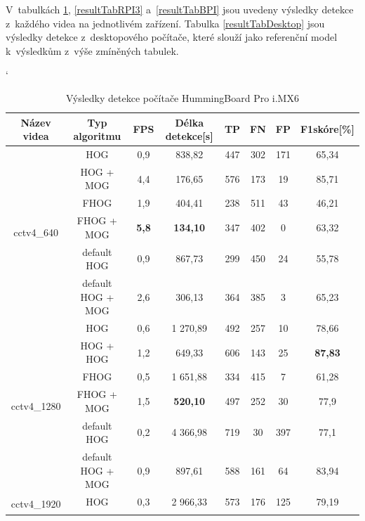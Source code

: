 V~tabulkách \ref{resultTabIMX}, \ref{resultTabRPI3} a~\ref{resultTabBPI} jsou uvedeny výsledky detekce z~každého videa na jednotlivém zařízení. Tabulka \ref{resultTabDesktop} jsou výsledky detekce z~desktopového počítače, které slouží jako referenční model k~výsledkům z~výše zmíněných tabulek.  
\begin{table}[H]
\catcode`
\centering
\caption{Výsledky detekce počítače HummingBoard Pro i.MX6 }
\label{resultTabIMX}
\begin{tabular}{|c|c|c|c|c|c|c|c|}
\hline
{Název videa}        & Typ algoritmu  & FPS & Délka detekce[s] & TP           & FN      & FP      & F1skóre[\%] \\  \hline
\multirow{6}{*}{cctv4\_640}  & HOG &    0,9 & 838,82  & 447 &      302 &     171 &   65,34      \\ \cline{2-8}  
      & HOG + MOG                  &    4,4 & 176,65  & 576 &    173 &     19 &      85,71      \\ \cline{2-8}  
      & FHOG                       &    1,9 & 404,41  & 238 &    511 &     43 &      46,21      \\ \cline{2-8}  
      & FHOG + MOG                 &    \textbf{5,8} & \textbf{134,10}   & 347 &    402 &     0 &       63,32      \\ \cline{2-8} 
      &  default HOG               &    0,9 & 867,73  & 299 &    450 &     24 &      55,78      \\ \cline{2-8}  
      &  default HOG + MOG         &    2,6 & 306,13  & 364 &    385 &     3 &       65,23      \\ \hline \hline   
\multirow{6}{*}{cctv4\_1280}& HOG   &    0,6 & 1 270,89  & 492 &    257 &     10 &      78,66      \\ \cline{2-8}  
      & HOG + HOG                  &    1,2 & 649,33  & 606 &    143 &     25 &      \textbf{87,83}      \\ \cline{2-8}  
      & FHOG                       &    0,5 & 1 651,88  & 334 &    415 &     7 &       61,28      \\ \cline{2-8}  
      & FHOG + MOG                 &    1,5 & \textbf{520,10}   & 497 &    252 &     30 &      77,9  \\ \cline{2-8} 
      &  default HOG               &    0,2 & 4 366,98   & 719 &    30 &      397 &     77,1  \\ \cline{2-8}  
      &  default HOG + MOG         &    0,9 & 897,61  & 588 &    161 &     64 &      83,94      \\ \hline \hline  
\multirow{6}{*}{cctv4\_1920}& HOG  &    0,3 & 2 966,33  & 573 &   176 &     125 &      79,19      \\ \cline{2-8}  

\end{tabular}
\end{table}
